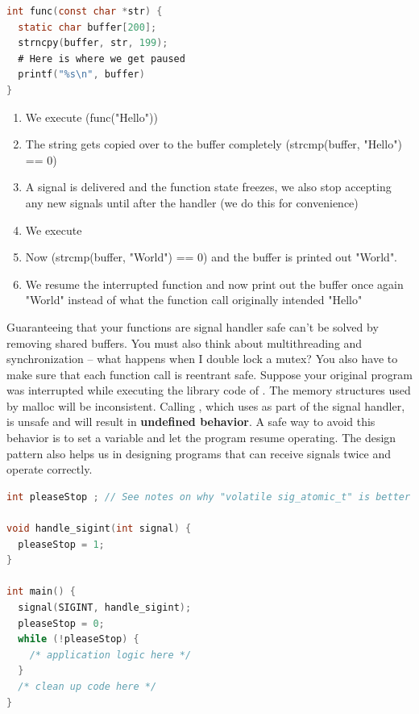 \begin{lstlisting}[language=C]
int func(const char *str) {
  static char buffer[200];
  strncpy(buffer, str, 199);
  # Here is where we get paused
  printf("%s\n", buffer)
}
\end{lstlisting}

\begin{enumerate}
\item We execute \keyword(func("Hello"))
\item The string gets copied over to the buffer completely (strcmp(buffer, "Hello") == 0)
\item A signal is delivered and the function state freezes, we also stop accepting any new signals until after the handler (we do this for convenience)
\item We execute 
\item Now (strcmp(buffer, "World") == 0) and the buffer is printed out "World".
\item We resume the interrupted function and now print out the buffer once again "World" instead of what the function call originally intended "Hello"
\end{enumerate}

Guaranteeing that your functions are signal handler safe can't be solved by removing shared buffers.
You must also think about multithreading and synchronization -- what happens when I double lock a mutex?
You also have to make sure that each function call is reentrant safe.
Suppose your original program was interrupted while executing the library code of .
The memory structures used by malloc will be inconsistent.
Calling , which uses  as part of the signal handler, is unsafe and will result in \textbf{undefined behavior}.
A safe way to avoid this behavior is to set a variable and let the program resume operating.
The design pattern also helps us in designing programs that can receive signals twice and operate correctly.

\begin{lstlisting}[language=C]
int pleaseStop ; // See notes on why "volatile sig_atomic_t" is better

void handle_sigint(int signal) {
  pleaseStop = 1;
}

int main() {
  signal(SIGINT, handle_sigint);
  pleaseStop = 0;
  while (!pleaseStop) {
    /* application logic here */
  }
  /* clean up code here */
}
\end{lstlisting}

